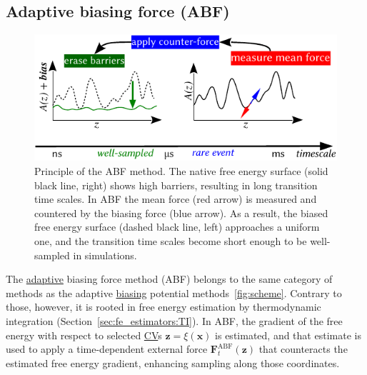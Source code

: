 \documentclass[9pt,review]{livecoms}
\newcommand{\vx}{\mathbf{x}}
\newcommand{\vz}{\mathbf{z}}
\newcommand{\vF}{\mathbf{F}}
\begin{document}
\subsection{Adaptive biasing force (ABF)}
\label{sec:ABF}

\begin{figure}
    \centering
    \includegraphics{Figures/abf_new.pdf}
    \caption{Principle of the ABF method. The native free energy surface (solid black line, right) shows high barriers, resulting in long transition time scales.
    In ABF the mean force (red arrow) is measured and countered by the biasing force (blue arrow). As a result, the biased free energy surface (dashed black line, left) approaches a uniform one, and the transition time scales become short enough to be well-sampled in simulations.}
    \label{fig:ABF}
\end{figure}

The \hyperlink{ref:Adaptive} {adaptive} biasing force method (ABF)\cite{Darve2001, Comer2015} belongs to the same category of methods as the adaptive \hyperlink{ref:biasingE} {biasing} potential methods~\ref{fig:scheme}. Contrary to those, however, it is rooted in free energy estimation by thermodynamic integration (Section~\ref{sec:fe_estimators:TI}).
In ABF, the gradient of the free energy with respect to selected \hyperlink{ref:CV} {CV}s $\vz = \xi(\vx)$ is estimated, and that estimate is used to apply a time-dependent external force $\vF^\mathrm{ABF}_t(\vz)$ that counteracts the estimated free energy gradient, enhancing sampling along those coordinates.
\end{document}
